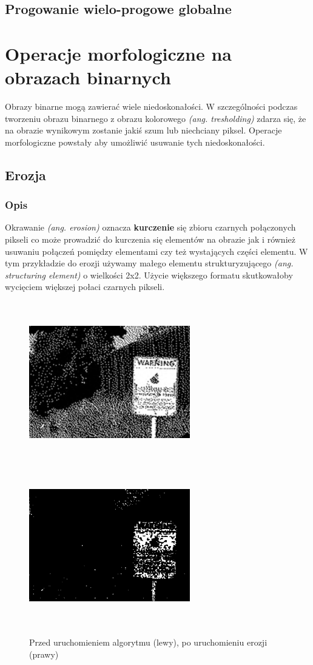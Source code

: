 \documentclass[a4paper,12pt]{book}
\begin{document}
\section{Progowanie wielo-progowe globalne}

\chapter{Operacje morfologiczne na obrazach binarnych}
Obrazy binarne mogą zawierać wiele niedoskonałości. W szczególności podczas tworzeniu obrazu binarnego z obrazu kolorowego \textit{(ang. tresholding)} zdarza się, że na obrazie wynikowym zostanie jakiś szum lub niechciany piksel. Operacje morfologiczne powstały aby umożliwić usuwanie tych niedoskonałości. 
\section{Erozja}
\subsection{Opis}
Okrawanie \textit{(ang. erosion)} oznacza \textbf{kurczenie} się zbioru czarnych połączonych pikseli co może prowadzić do kurczenia się elementów na obrazie jak i również usuwaniu połączeń pomiędzy elementami czy też wystających części elementu. W tym przykładzie do erozji używamy małego elementu strukturyzującego \textit{(ang. structuring element)} o wielkości 2x2. Użycie większego formatu skutkowałoby wycięciem większej połaci czarnych pikseli. 
\begin{figure}[H]
	\caption{Przed uruchomieniem algorytmu (lewy), po uruchomieniu erozji (prawy)}
	\includegraphics[width=7cm, height=7cm]{binary-unmodified.png}
	\includegraphics[width=7cm, height=7cm]{binary-erosion.png}
\end{figure}
\end{document}
